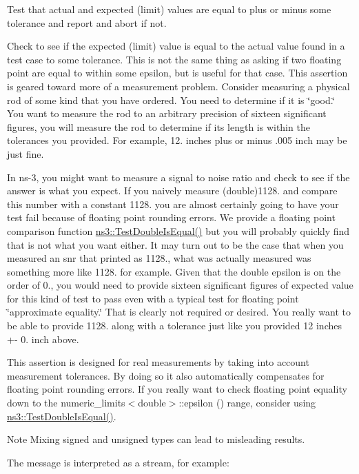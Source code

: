 Test that actual and expected (limit) values are equal to plus or minus some tolerance and report and abort if not. 

Check to see if the expected (limit) value is equal to the actual value found in a test case to some tolerance. This is not the same thing as asking if two floating point are equal to within some epsilon, but is useful for that case. This assertion is geared toward more of a measurement problem. Consider measuring a physical rod of some kind that you have ordered. You need to determine if it is \char`\"{}good.\char`\"{} You want to measure the rod to an arbitrary precision of sixteen significant figures, you will measure the rod to determine if its length is within the tolerances you provided. For example, 12. inches plus or minus .005 inch may be just fine.

In ns-\/3, you might want to measure a signal to noise ratio and check to see if the answer is what you expect. If you naively measure (double)1128. and compare this number with a constant 1128. you are almost certainly going to have your test fail because of floating point rounding errors. We provide a floating point comparison function \hyperlink{group__testing_ga13a5d60f4d34641d7e2fd799f2c4d952}{ns3\+::\+Test\+Double\+Is\+Equal()} but you will probably quickly find that is not what you want either. It may turn out to be the case that when you measured an snr that printed as 1128., what was actually measured was something more like 1128. for example. Given that the double epsilon is on the order of 0., you would need to provide sixteen significant figures of expected value for this kind of test to pass even with a typical test for floating point \char`\"{}approximate
equality.\char`\"{} That is clearly not required or desired. You really want to be able to provide 1128. along with a tolerance just like you provided 12 inches +-\/ 0. inch above.

This assertion is designed for real measurements by taking into account measurement tolerances. By doing so it also automatically compensates for floating point rounding errors. If you really want to check floating point equality down to the numeric\+\_\+limits$<$double$>$\+::epsilon () range, consider using \hyperlink{group__testing_ga13a5d60f4d34641d7e2fd799f2c4d952}{ns3\+::\+Test\+Double\+Is\+Equal()}.

\begin{DoxyNote}{Note}
Mixing signed and unsigned types can lead to misleading results.
\end{DoxyNote}
The message is interpreted as a stream, for example\+:


